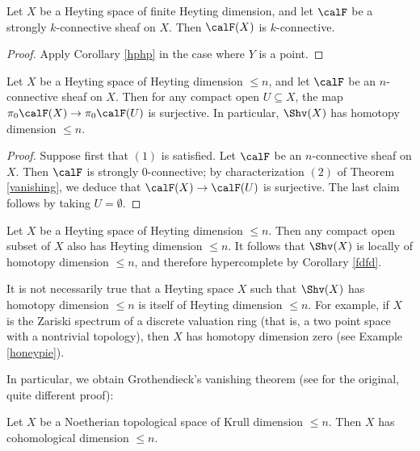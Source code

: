 \begin{corollary}\label{gra}
Let $X$ be a Heyting space of finite Heyting dimension, and let $\calF$ be
a strongly $k$-connective sheaf on $X$. Then $\calF(X)$ is
$k$-connective.
\end{corollary}

\begin{proof}
Apply Corollary \ref{hphp} in the case where $Y$ is a point.
\end{proof}

\begin{corollary}\label{turkant}
Let $X$ be a Heyting space of Heyting dimension $\leq n$, and let $\calF$ be an
$n$-connective sheaf on $X$. Then for any compact open $U \subseteq X$, the
map $\pi_0 \calF(X) \rightarrow \pi_0 \calF(U)$ is surjective. In particular, $\Shv(X)$ has homotopy dimension $\leq n$.
\end{corollary}

\begin{proof}
Suppose first that $(1)$ is satisfied. Let $\calF$ be an $n$-connective sheaf on $X$.
Then $\calF$ is strongly $0$-connective; by characterization $(2)$ of Theorem \ref{vanishing}, we deduce that $\calF(X) \rightarrow \calF(U)$ is surjective. The last claim follows by taking
$U = \emptyset$.
\end{proof}

\begin{remark}
Let $X$ be a Heyting space of Heyting dimension $\leq n$. Then any compact open subset
of $X$ also has Heyting dimension $\leq n$. It follows that $\Shv(X)$ is locally of homotopy dimension $\leq n$, and therefore hypercomplete by Corollary \ref{fdfd}.
\end{remark}

\begin{remark}
It is not necessarily true that a Heyting space $X$ such that $\Shv(X)$ has homotopy dimension $\leq n$ is itself of Heyting dimension $\leq n$. For example, if $X$ is the Zariski spectrum of a discrete valuation ring (that is, a two point space with a nontrivial topology), then $X$ has homotopy dimension zero (see Example \ref{honeypie}).
\end{remark}

In particular, we obtain Grothendieck's vanishing theorem (see \cite{tohoku} for the original, quite different proof):

\begin{corollary}
Let $X$ be a Noetherian topological space of Krull dimension $\leq
n$. Then $X$ has cohomological dimension $\leq n$.
\end{corollary}

